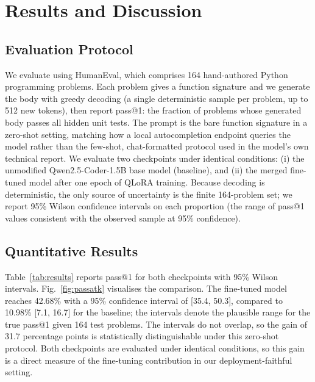 \section{Results and Discussion}

\subsection{Evaluation Protocol}

We evaluate using HumanEval, which comprises 164 hand-authored Python
programming problems. Each problem gives a function signature and we
generate the body with greedy decoding (a single deterministic sample
per problem, up to 512 new tokens), then report pass@1: the fraction
of problems whose generated body passes all hidden unit tests. The
prompt is the bare function signature in a zero-shot setting, matching
how a local autocompletion endpoint queries the model rather than the
few-shot, chat-formatted protocol used in the model's own technical
report. We evaluate two checkpoints under identical conditions:
(i) the unmodified Qwen2.5-Coder-1.5B base model (baseline), and
(ii) the merged fine-tuned model after one epoch of QLoRA training.
Because decoding is deterministic, the only source of uncertainty is
the finite 164-problem set; we report 95\% Wilson confidence intervals
on each proportion (the range of pass@1 values consistent with the
observed sample at 95\% confidence).

\subsection{Quantitative Results}

Table~\ref{tab:results} reports pass@1 for both checkpoints with 95\%
Wilson intervals. Fig.~\ref{fig:passatk} visualises the comparison.
The fine-tuned model reaches 42.68\% with a 95\% confidence interval
of [35.4, 50.3], compared to 10.98\% [7.1, 16.7] for the baseline;
the intervals denote the plausible range for the true pass@1 given
164 test problems. The intervals do not overlap, so the gain of 31.7
percentage points is statistically distinguishable under this
zero-shot protocol. Both checkpoints are evaluated under identical
conditions, so this gain is a direct measure of the fine-tuning
contribution in our deployment-faithful setting.

